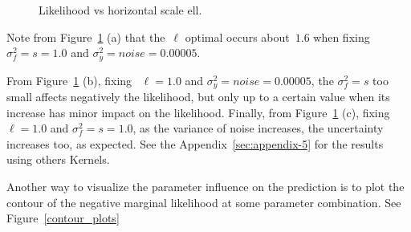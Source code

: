 \documentclass[]{IEEEtran}
\begin{document}
\begin{figure}[!ht]
  \centering
  \hspace{1mm}
  \hspace{1mm}
  \hspace{1mm}
 \caption{Likelihood vs horizontal scale ell.}
  \label{like_vs_ell_s_noise}
\end{figure}\par

Note from Figure~\ref{like_vs_ell_s_noise} (a) that the~\(\ell\) optimal occurs about~\(1.6\) when fixing \({ \sigma  }_{ f }^{ 2 }=s=1.0\) and \({ \sigma  }_{ y }^{ 2 }=noise=0.00005\). 

From Figure~\ref{like_vs_ell_s_noise} (b), fixing ~\(\ell=1.0\) and \({ \sigma  }_{ y }^{ 2 }=noise=0.00005\), the \({ \sigma  }_{ f }^{ 2 }=s\) too small affects negatively the likelihood, but only up to a certain value when its increase has minor impact on the likelihood. 
Finally, from Figure~\ref{like_vs_ell_s_noise} (c), fixing ~\(\ell=1.0\) and \({ \sigma  }_{ f }^{ 2 }=s=1.0\), as the variance of noise increases, the uncertainty increases too, as expected. 
See the Appendix~\ref{sec:appendix-5} for the results using others Kernels.\par
Another way to visualize the parameter influence on the prediction is to plot the contour of the negative marginal likelihood at some parameter combination. See Figure~\ref{contour_plots}
\end{document}
